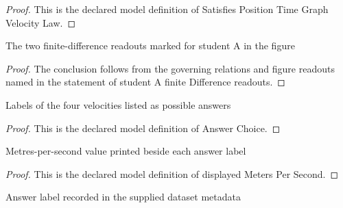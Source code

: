 \begin{proof}
  This is the declared model definition of Satisfies Position Time Graph Velocity Law.
\end{proof}
\begin{lemma}
  \label{lem:physics:phyx-mini-0829:phyxminiproblems-problemphyxmini0829-studenta-finitedifference-readouts}
  The two finite-difference readouts marked for student A in the figure
\end{lemma}
\begin{proof}
  The conclusion follows from the governing relations and figure readouts named in the statement of student A finite Difference readouts.
\end{proof}
\begin{definition}
  \label{def:physics:phyx-mini-0829:phyxminiproblems-problemphyxmini0829-answerchoice}
  Labels of the four velocities listed as possible answers
\end{definition}
\begin{proof}
  This is the declared model definition of Answer Choice.
\end{proof}
\begin{definition}
  \label{def:physics:phyx-mini-0829:phyxminiproblems-problemphyxmini0829-answerchoice-displayedmeterspersecond}
  Metres-per-second value printed beside each answer label
\end{definition}
\begin{proof}
  This is the declared model definition of displayed Meters Per Second.
\end{proof}
\begin{definition}
  \label{def:physics:phyx-mini-0829:phyxminiproblems-problemphyxmini0829-recordedanswerchoice}
  Answer label recorded in the supplied dataset metadata
\end{definition}
